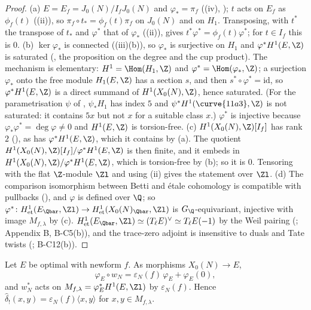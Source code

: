\begin{proof}
(a) $E=E_f=J_0(N)/I_fJ_0(N)$ and $\varphi_*=\pi_f$ ((iv), ); $t$ acts on $E_f$ as $\phi_f(t)$ ((ii)), so
$\pi_f\circ t_*=\phi_f(t)\pi_f$ on $J_0(N)$ and on $H_1$. Transposing, with $t^*$ the transpose of $t_*$ and $\varphi^*$ that of $\varphi_*$ ((ii)), gives
$t^*\varphi^*=\phi_f(t)\varphi^*$; for $t\in I_f$ this is $0$.
(b) $\ker\varphi_*$ is connected ((iii)(b)), so $\varphi_*$ is surjective on $H_1$ and $\varphi^*H^1(E,\Z)$ is saturated (, the proposition on the degree
and the cup product). The mechanism is elementary: $H^1=\Hom(H_1,\Z)$ and $\varphi^*=\Hom(\varphi_*,\Z)$; a surjection $\varphi_*$ onto the free module $H_1(E,\Z)$ has a section
$s$, and then $s^*\circ\varphi^*=\mathrm{id}$, so $\varphi^*H^1(E,\Z)$ is a direct summand of $H^1(X_0(N),\Z)$, hence saturated. (For the parametrisation $\psi$ of , $\psi_*H_1$
has index $5$ and $\psi^*H^1(\curve{11a3},\Z)$ is not saturated: it contains $5x$ but not $x$ for a suitable class $x$.) $\varphi^*$ is injective because $\varphi_*\varphi^*=\deg\varphi\ne0$ and $H^1(E,\Z)$ is torsion-free.
(c) $H^1(X_0(N),\Z)[I_f]$ has rank $2$ (), as has $\varphi^*H^1(E,\Z)$, which it contains by (a). The quotient $H^1(X_0(N),\Z)[I_f]/\varphi^*H^1(E,\Z)$ is then finite, and it
embeds in $H^1(X_0(N),\Z)/\varphi^*H^1(E,\Z)$, which is torsion-free by (b); so it is $0$. Tensoring with the flat $\Z$-module $\Zl$ and using (ii) gives the statement
over $\Zl$.
(d) The comparison isomorphism between Betti and \'etale cohomology is compatible with pullbacks (), and $\varphi$ is defined over $\Q$; so $\varphi^*\colon H^1_{\mathrm{et}}(E_{\Qbar},\Zl)\to
H^1_{\mathrm{et}}(X_0(N)_{\Qbar},\Zl)$ is $G_\Q$-equivariant, injective with image $M_{f,\lambda}$ by (c). $H^1_{\mathrm{et}}(E_{\Qbar},\Zl)\simeq(T_\ell E)^\vee\simeq T_\ell E(-1)$ by the Weil pairing
(; Appendix B, B-C5(b)), and the trace-zero adjoint is insensitive to duals and Tate twists (; B-C12(b)).
\end{proof}

\begin{lemma}[$w_N$ on $M_{f,\lambda}$]\label{lem:moddeg:wn-on-mf}
Let $E$ be optimal with newform $f$. As morphisms $X_0(N)\to E$,
\[
\varphi_E\circ w_N=\varepsilon_N(f)\,\varphi_E+\varphi_E(0),
\]
and $w_N^*$ acts on $M_{f,\lambda}=\varphi_E^*H^1(E,\Zl)$ by $\varepsilon_N(f)$. Hence $\hat\delta_!(x,y)=\varepsilon_N(f)\langle x,y\rangle$ for $x,y\in M_{f,\lambda}$.
\end{lemma}

